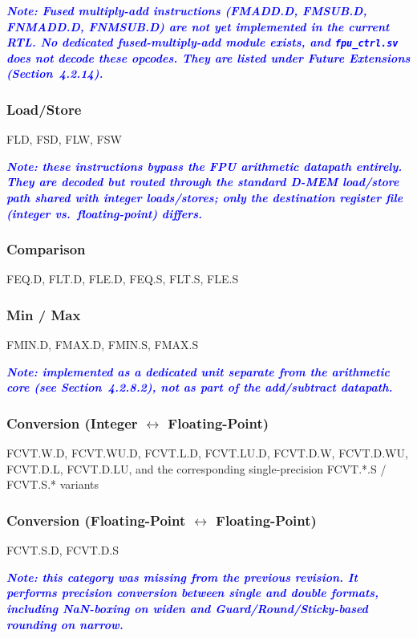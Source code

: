 \textcolor{blue}{\textbf{\textit{Note: Fused multiply-add instructions
(FMADD.D, FMSUB.D, FNMADD.D, FNMSUB.D) are not yet implemented in the current
RTL. No dedicated fused-multiply-add module exists, and \texttt{fpu\_ctrl.sv}
does not decode these opcodes. They are listed under Future Extensions
(Section~4.2.14).}}}

\subsubsection{Load/Store}
FLD, FSD, FLW, FSW

\textcolor{blue}{\textbf{\textit{Note: these instructions bypass the FPU
arithmetic datapath entirely. They are decoded but routed through the
standard \gls{D-MEM} load/store path shared with integer loads/stores; only
the destination register file (integer vs.\ floating-point) differs.}}}

\subsubsection{Comparison}
FEQ.D, FLT.D, FLE.D, FEQ.S, FLT.S, FLE.S

\subsubsection{Min / Max}
FMIN.D, FMAX.D, FMIN.S, FMAX.S

\textcolor{blue}{\textbf{\textit{Note: implemented as a dedicated unit
separate from the arithmetic core (see Section~4.2.8.2), not as part of the
add/subtract datapath.}}}

\subsubsection{Conversion (Integer $\leftrightarrow$ Floating-Point)}
FCVT.W.D, FCVT.WU.D, FCVT.L.D, FCVT.LU.D, FCVT.D.W, FCVT.D.WU, FCVT.D.L,
FCVT.D.LU, and the corresponding single-precision FCVT.*.S / FCVT.S.* variants

\subsubsection{Conversion (Floating-Point $\leftrightarrow$ Floating-Point)}
FCVT.S.D, FCVT.D.S

\textcolor{blue}{\textbf{\textit{Note: this category was missing from the
previous revision. It performs precision conversion between single and
double formats, including NaN-boxing on widen and Guard/Round/Sticky-based
rounding on narrow.}}}

